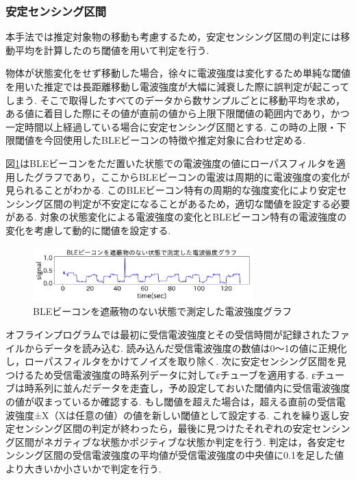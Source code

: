 \documentclass[Japanese]{dicomopapers}
\begin{document}
\subsubsection{安定センシング区間}
本手法では推定対象物の移動も考慮するため，安定センシング区間の判定には移動平均を計算したのち閾値を用いて判定を行う.





物体が状態変化をせず移動した場合，徐々に電波強度は変化するため単純な閾値を用いた推定では長距離移動し電波強度が大幅に減衰した際に誤判定が起こってしまう.
そこで取得したすべてのデータから数サンプルごとに移動平均を求め，ある値に着目した際にその値が直前の値から上限下限閾値の範囲内であり，かつ一定時間以上経過している場合に安定センシング区間とする.
この時の上限・下限閾値を今回使用したBLEビーコンの特徴や推定対象に合わせ定める.

図\ref{nomal-data}はBLEビーコンをただ置いた状態での電波強度の値にローパスフィルタを適用したグラフであり，ここからBLEビーコンの電波は周期的に電波強度の変化が見られることがわかる.
このBLEビーコン特有の周期的な強度変化により安定センシング区間の判定が不安定になることがあるため，適切な閾値を設定する必要がある.
対象の状態変化による電波強度の変化とBLEビーコン特有の電波強度の変化を考慮して動的に閾値を設定する.
\begin{figure}[b]
    \centering
    \includegraphics[width=8.5cm]{bokoboko.png}
    \caption{BLEビーコンを遮蔽物のない状態で測定した電波強度グラフ}
    \label{nomal-data}
\end{figure}

オフラインプログラムでは最初に受信電波強度とその受信時間が記録されたファイルからデータを読み込む.
読み込んだ受信電波強度の数値は0〜1の値に正規化し，ローパスフィルタをかけてノイズを取り除く.
次に安定センシング区間を見つけるため受信電波強度の時系列データに対してεチューブを適用する.
εチューブは時系列に並んだデータを走査し，予め設定しておいた閾値内に受信電波強度の値が収まっているか確認する.
もし閾値を超えた場合は，超える直前の受信電波強度±X（Xは任意の値）の値を新しい閾値として設定する.
これを繰り返し安定センシング区間の判定が終わったら，最後に見つけたそれぞれの安定センシング区間がネガティブな状態かポジティブな状態か判定を行う.
判定は，各安定センシング区間の受信電波強度の平均値が受信電波強度の中央値に0.1を足した値より大きいか小さいかで判定を行う.
\end{document}
